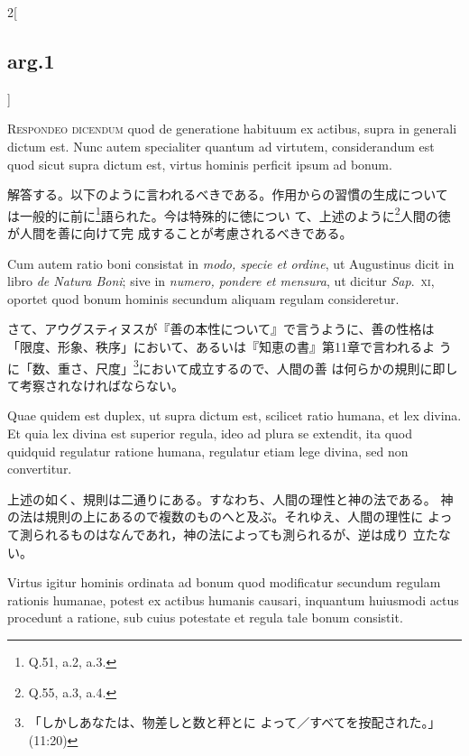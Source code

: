 \documentclass[paper=a4paper,fontsize=10pt,jafontsize=9pt,titlepage]{jlreq}
\begin{document}
\begin{paracol}{2}[\subsection{arg.1}]

{\scshape Respondeo dicendum} quod de generatione habituum ex actibus,
supra in generali dictum est. Nunc autem specialiter quantum ad
virtutem, considerandum est quod sicut supra dictum est, virtus
hominis perficit ipsum ad bonum.

\switchcolumn

解答する。以下のように言われるべきである。作用からの習慣の生成について
は一般的に前に\footnote{Q.51, a.2, a.3.}語られた。今は特殊的に徳につい
て、上述のように\footnote{Q.55, a.3, a.4.}人間の徳が人間を善に向けて完
成することが考慮されるべきである。

\switchcolumn*

Cum autem ratio boni consistat in {\itshape modo, specie et ordine},
ut Augustinus dicit in libro {\itshape de Natura Boni}; sive in
{\itshape numero, pondere et mensura}, ut dicitur {\itshape
Sap}.~{\scshape xi}, oportet quod bonum hominis secundum aliquam
regulam consideretur.

\switchcolumn

さて、アウグスティヌスが『善の本性について』で言うように、善の性格は
 「限度、形象、秩序」において、あるいは『知恵の書』第11章で言われるよ
 うに「数、重さ、尺度」\footnote{「しかしあなたは、物差しと数と秤とに
 よって／すべてを按配された。」(11:20)}において成立するので、人間の善
 は何らかの規則に即して考察されなければならない。

\switchcolumn*

Quae quidem est duplex, ut supra dictum est, scilicet ratio humana,
et lex divina. Et quia lex divina est superior regula, ideo ad plura
se extendit, ita quod quidquid regulatur ratione humana, regulatur
etiam lege divina, sed non convertitur.

\switchcolumn

上述の如く、規則は二通りにある。すなわち、人間の理性と神の法である。
 神の法は規則の上にあるので複数のものへと及ぶ。それゆえ、人間の理性に
 よって測られるものはなんであれ，神の法によっても測られるが、逆は成り
 立たない。

\switchcolumn*

Virtus igitur hominis ordinata ad bonum quod modificatur secundum
regulam rationis humanae, potest ex actibus humanis causari, inquantum
huiusmodi actus procedunt a ratione, sub cuius potestate et regula
tale bonum consistit.


\end{paracol}
\end{document}
